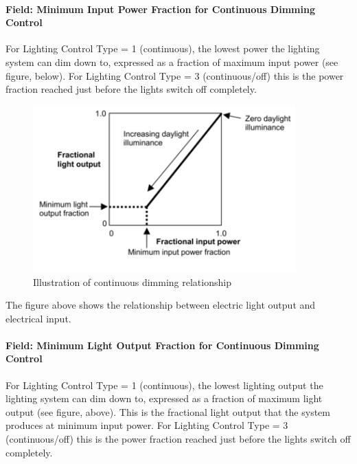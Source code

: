 \paragraph{Field: Minimum Input Power Fraction for Continuous Dimming Control}\label{field-minimum-input-power-fraction-for-continuous-dimming-control-1}

For Lighting Control Type = 1 (continuous), the lowest power the lighting system can dim down to, expressed as a fraction of maximum input power (see figure, below). For Lighting Control Type = 3 (continuous/off) this is the power fraction reached just before the lights switch off completely.

\begin{figure}[hbtp] %
\centering
\includegraphics[width=0.9\textwidth, height=0.9\textheight, keepaspectratio=true]{media/image105.png}
\caption{Illustration of continuous dimming relationship \protect \label{fig:illustration-of-continuous-dimming-001}}
\end{figure}

The figure above shows the relationship between electric light output and electrical input.

\paragraph{Field: Minimum Light Output Fraction for Continuous Dimming Control}\label{field-minimum-light-output-fraction-for-continuous-dimming-control-1}

For Lighting Control Type = 1 (continuous), the lowest lighting output the lighting system can dim down to, expressed as a fraction of maximum light output (see figure, above). This is the fractional light output that the system produces at minimum input power. For Lighting Control Type = 3 (continuous/off) this is the power fraction reached just before the lights switch off completely.

